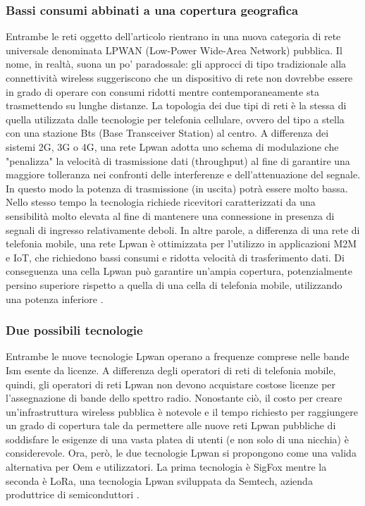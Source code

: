 \documentclass[a4paper]{report} %
\begin{document}
\subsubsection{Bassi consumi abbinati a una copertura geografica}
Entrambe le reti oggetto dell'articolo rientrano in una nuova categoria di rete universale denominata LPWAN (Low-Power Wide-Area Network) pubblica. Il nome, in realtà, suona un po' paradossale: gli approcci di tipo tradizionale alla connettività wireless suggeriscono che un dispositivo di rete non dovrebbe essere in grado di operare con consumi ridotti mentre contemporaneamente sta trasmettendo su lunghe distanze. La topologia dei due tipi di reti è la stessa di quella utilizzata dalle tecnologie per telefonia cellulare, ovvero del tipo a stella con una stazione Bts (Base Transceiver Station) al centro. A differenza dei sistemi 2G, 3G o 4G, una rete Lpwan adotta uno schema di modulazione che "penalizza" la velocità di trasmissione dati (throughput) al fine di garantire una maggiore tolleranza nei confronti delle interferenze e dell'attenuazione del segnale. In questo modo la potenza di trasmissione (in uscita) potrà essere molto bassa. Nello stesso tempo la tecnologia richiede ricevitori caratterizzati da una sensibilità molto elevata al fine di mantenere una connessione in presenza di segnali di ingresso relativamente deboli. In altre parole, a differenza di una rete di telefonia mobile, una rete Lpwan è ottimizzata per l'utilizzo in applicazioni M2M e IoT, che richiedono bassi consumi e ridotta velocità di trasferimento dati. Di conseguenza una cella Lpwan può garantire un'ampia copertura, potenzialmente persino superiore rispetto a quella di una cella di telefonia mobile, utilizzando una potenza inferiore \cite{art:rif.23}.

\subsubsection{Due possibili tecnologie}
Entrambe le nuove tecnologie Lpwan operano a frequenze comprese nelle bande Ism esente da licenze. A differenza degli operatori di reti di telefonia mobile, quindi, gli operatori di reti Lpwan non devono acquistare costose licenze per l'assegnazione di bande dello spettro radio. Nonostante ciò, il costo per creare un'infrastruttura wireless pubblica è notevole e il tempo richiesto per raggiungere un grado di copertura tale da permettere alle nuove reti Lpwan pubbliche di soddisfare le esigenze di una vasta platea di utenti (e non solo di una nicchia) è considerevole. Ora, però, le due tecnologie Lpwan si propongono come una valida alternativa per Oem e utilizzatori. La prima tecnologia è SigFox mentre la seconda è LoRa, una tecnologia Lpwan sviluppata da Semtech, azienda produttrice di semiconduttori \cite{art:rif.23}.
\end{document}

